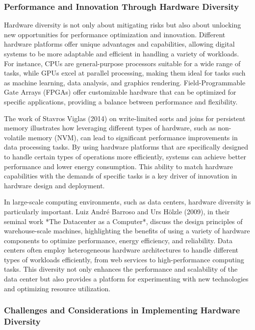 \documentclass[12pt,twoside]{article}
\begin{document}
\subsubsection{Performance and Innovation Through Hardware Diversity}

Hardware diversity is not only about mitigating risks but also about unlocking new opportunities for performance optimization and innovation. Different hardware platforms offer unique advantages and capabilities, allowing digital systems to be more adaptable and efficient in handling a variety of workloads. For instance, CPUs are general-purpose processors suitable for a wide range of tasks, while GPUs excel at parallel processing, making them ideal for tasks such as machine learning, data analysis, and graphics rendering. Field-Programmable Gate Arrays (FPGAs) offer customizable hardware that can be optimized for specific applications, providing a balance between performance and flexibility.

The work of Stavros Viglas (2014) on write-limited sorts and joins for persistent memory illustrates how leveraging different types of hardware, such as non-volatile memory (NVM), can lead to significant performance improvements in data processing tasks. By using hardware platforms that are specifically designed to handle certain types of operations more efficiently, systems can achieve better performance and lower energy consumption. This ability to match hardware capabilities with the demands of specific tasks is a key driver of innovation in hardware design and deployment.

In large-scale computing environments, such as data centers, hardware diversity is particularly important. Luiz André Barroso and Urs Hölzle (2009), in their seminal work *The Datacenter as a Computer*, discuss the design principles of warehouse-scale machines, highlighting the benefits of using a variety of hardware components to optimize performance, energy efficiency, and reliability. Data centers often employ heterogeneous hardware architectures to handle different types of workloads efficiently, from web services to high-performance computing tasks. This diversity not only enhances the performance and scalability of the data center but also provides a platform for experimenting with new technologies and optimizing resource utilization.

\subsubsection{Challenges and Considerations in Implementing Hardware Diversity}
\end{document}
